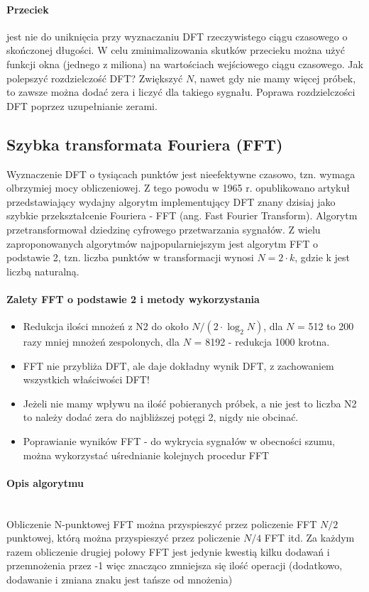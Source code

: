 \documentclass[a4paper,twoside]{report}
\begin{document}
\paragraph{Przeciek} jest nie do uniknięcia przy wyznaczaniu DFT rzeczywistego ciągu czasowego o skończonej długości.
W celu zminimalizowania skutków przecieku można użyć funkcji okna (jednego z miliona) na wartościach wejściowego ciągu czasowego.
Jak polepszyć rozdzielczość DFT? Zwiększyć $N$, nawet gdy nie mamy więcej próbek, to zawsze można dodać zera i liczyć dla takiego sygnału. 
Poprawa rozdzielczości DFT poprzez uzupełnianie zerami.

\subsection{Szybka transformata Fouriera (FFT)}
Wyznaczenie DFT o tysiącach punktów jest nieefektywne czasowo, tzn. wymaga olbrzymiej mocy obliczeniowej. Z tego powodu w 1965 r. opublikowano artykuł przedstawiający wydajny algorytm implementujący DFT znany dzisiaj jako szybkie przekształcenie Fouriera  - FFT (ang. Fast Fourier Transform). Algorytm przetransformował dziedzinę cyfrowego przetwarzania sygnałów.
Z wielu zaproponowanych algorytmów najpopularniejszym jest algorytm FFT o podstawie 2, tzn. liczba punktów w transformacji wynosi $N=2\cdot k$, gdzie k jest liczbą naturalną.
\paragraph{Zalety FFT o podstawie 2 i metody wykorzystania}
\begin{itemize}
	\item Redukcja ilości mnożeń z N2 do około $N/(2 \cdot \log_2 N)$, dla $N$ = 512 to 200 razy mniej mnożeń zespolonych, dla $N$ = 8192 - redukcja 1000 krotna. 
	\item FFT nie przybliża DFT, ale daje dokładny wynik DFT, z zachowaniem wszystkich właściwości DFT! 
	\item Jeżeli nie mamy wpływu na ilość pobieranych próbek, a nie jest to liczba N2 to należy dodać zera do najbliższej potęgi 2, nigdy nie obcinać.
	\item Poprawianie wyników FFT - do wykrycia sygnałów w obecności szumu, można wykorzystać uśrednianie kolejnych procedur FFT
\end{itemize}

\paragraph{Opis algorytmu\\\\}
Obliczenie N-punktowej FFT można przyspieszyć przez policzenie FFT $N/2$ punktowej, którą można przyspieszyć przez policzenie $N/4$ FFT itd. Za każdym razem obliczenie drugiej połowy FFT jest jedynie kwestią kilku dodawań i przemnożenia przez -1 więc znacząco zmniejsza się ilość operacji (dodatkowo, dodawanie i zmiana znaku jest tańsze od mnożenia)
\end{document}
